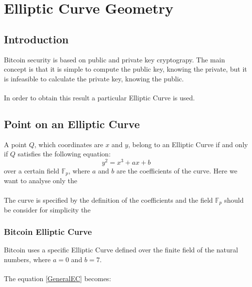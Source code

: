 
\chapter{Elliptic Curve Geometry} %

\label{EC} %


\newcommand{\keyword}[1]{\textbf{#1}}
\newcommand{\tabhead}[1]{\textbf{#1}}
\newcommand{\code}[1]{\texttt{#1}}
\newcommand{\file}[1]{\texttt{\bfseries#1}}
\newcommand{\option}[1]{\texttt{\itshape#1}}


\section{Introduction}
Bitcoin security is based on public and private key cryptograpy. The main concept is that it is simple to compute the public key, knowing the private, but it is infeasible to calculate the private key, knowing the public. \\ \\
In order to obtain this result a particular Elliptic Curve is used.

\section{Point on an Elliptic Curve}

A point $Q$, which coordinates are $x$ and $y$, belong to an Elliptic Curve if and only if $Q$ satisfies the following equation:
\begin{equation}\label{GeneralEC}
y^2=x^3+ax+b
\end{equation}
over a certain field $\mathbb{F}_p$, where $a$ and $b$ are the coefficients of the curve. Here we want to analyse only the  \\ \\
The curve is specified by the definition of the coefficients and the field $\mathbb{F}_p$ should be consider for simplicity the 

\subsection{Bitcoin Elliptic Curve}
Bitcoin uses a specific Elliptic Curve defined over the finite field of the natural numbers, where $a=0$ and $b=7$. \\ \\
The equation \ref{GeneralEC} becomes:

